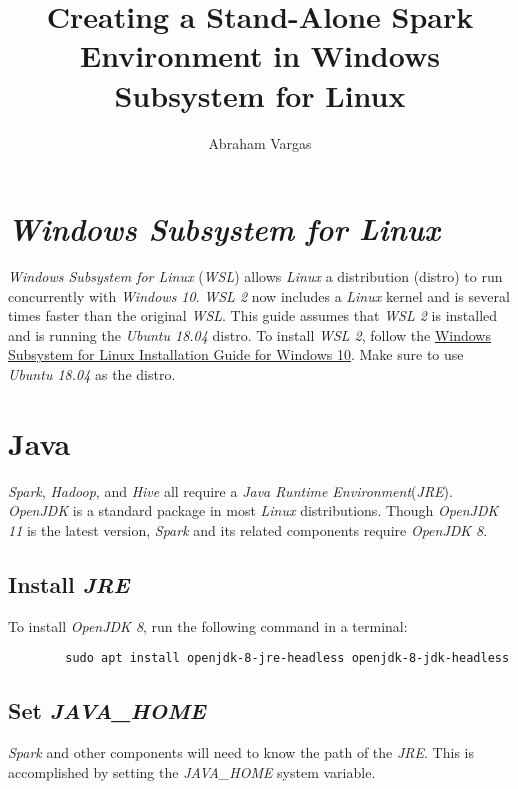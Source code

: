 \documentclass{article}
\begin{document}
\title{Creating a Stand-Alone Spark Environment in Windows Subsystem for Linux}
\author{Abraham Vargas}
\maketitle

\newpage
\tableofcontents
\newpage

\section{\emph{Windows Subsystem for Linux}}
\emph{Windows Subsystem for Linux} (\emph{WSL}) allows \emph{Linux} a distribution (distro) to
run concurrently with \emph{Windows 10}. \emph{WSL 2} now includes a \emph{Linux}
kernel and is several times faster than the original \emph{WSL}. This guide assumes that \emph{WSL 2}
is installed and is running the \emph{Ubuntu 18.04} distro. To install \emph{WSL 2}, follow the
\href{https://docs.microsoft.com/en-us/windows/wsl/install-win10}{Windows Subsystem for Linux Installation Guide for Windows 10}.
Make sure to use \emph{Ubuntu 18.04} as the distro.

\section{Java}
\emph{Spark}, \emph{Hadoop}, and \emph{Hive} all require a \emph{Java Runtime Environment}(\emph{JRE}).
\emph{OpenJDK} is a standard package in most \emph{Linux} distributions. Though \emph{OpenJDK 11}
is the latest version, \emph{Spark} and its related components require \emph{OpenJDK 8}.

    \subsection{Install \emph{JRE}}
    To install \emph{OpenJDK 8}, run the following command in a terminal:
    \begin{verbatim}
        sudo apt install openjdk-8-jre-headless openjdk-8-jdk-headless  
    \end{verbatim}

    \subsection{Set \emph{JAVA\_HOME}}
    \label{sec:javahome}
    \emph{Spark} and other components will need to know the path of the
    \emph{JRE}. This is accomplished by setting the \emph{JAVA\_HOME}
    system variable.
\end{document}
